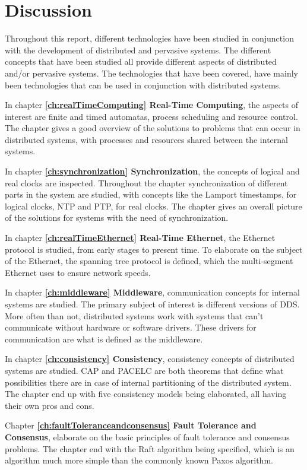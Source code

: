 \chapter{Discussion} \label{ch:discussion}
Throughout this report, different technologies have been studied in conjunction with the development of distributed and pervasive systems. The different concepts that have been studied all provide different aspects of distributed and/or pervasive systems. The technologies that have been covered, have mainly been technologies that can be used in conjunction with distributed systems.

In chapter \textbf{\ref{ch:realTimeComputing} Real-Time Computing}, the aspects of interest are finite and timed automatas, process scheduling and resource control. The chapter gives a good overview of the solutions to problems that can occur in distributed systems, with processes and resources shared between the internal systems.

In chapter \textbf{\ref{ch:synchronization} Synchronization}, the concepts of logical and real clocks are inspected. Throughout the chapter synchronization of different parts in the system are studied, with concepts like the Lamport timestamps, for logical clocks, NTP and PTP, for real clocks. The chapter gives an overall picture of the solutions for systems with the need of synchronization.

In chapter \textbf{\ref{ch:realTimeEthernet} Real-Time Ethernet}, the Ethernet protocol is studied, from early stages to present time. To elaborate on the subject of the Ethernet, the spanning tree protocol is defined, which the multi-segment Ethernet uses to ensure network speeds. 

In chapter \textbf{\ref{ch:middleware} Middleware}, communication concepts for internal systems are studied. The primary subject of interest is different versions of DDS. More often than not, distributed systems work with systems that can't communicate without hardware or software drivers. These drivers for communication are what is defined as the middleware.

In chapter \textbf{\ref{ch:consistency} Consistency}, consistency concepts of distributed systems are studied. CAP and PACELC are both theorems that define what possibilities there are in case of internal partitioning of the distributed system. The chapter end up with five consistency models being elaborated, all having their own pros and cons.

Chapter \textbf{\ref{ch:faultToleranceandconsensus} Fault Tolerance and Consensus}, elaborate on the basic principles of fault tolerance and consensus problems. The chapter end with the Raft algorithm being specified, which is an algorithm much more simple than the commonly known Paxos algorithm.

